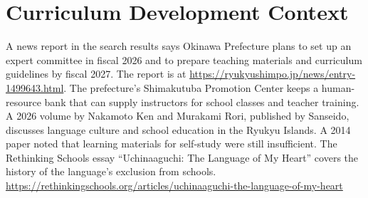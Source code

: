 \documentclass[12pt]{article}
\begin{document}
\section{Curriculum Development Context}
A news report in the search results says Okinawa Prefecture plans to set up an expert committee in fiscal 2026 and to prepare teaching materials and curriculum guidelines by fiscal 2027. The report is at \url{https://ryukyushimpo.jp/news/entry-1499643.html}. The prefecture's Shimakutuba Promotion Center keeps a human-resource bank that can supply instructors for school classes and teacher training. A 2026 volume by Nakamoto Ken and Murakami Rori, published by Sanseido, discusses language culture and school education in the Ryukyu Islands. A 2014 paper noted that learning materials for self-study were still insufficient. The Rethinking Schools essay ``Uchinaaguchi: The Language of My Heart'' covers the history of the language's exclusion from schools. \url{https://rethinkingschools.org/articles/uchinaaguchi-the-language-of-my-heart}
\end{document}
